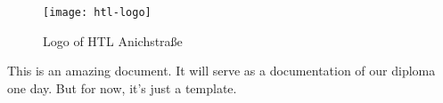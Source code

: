 \documentclass[../main.tex]{subfiles}
\begin{document}
\begin{figure}[bh]
\centering
\texttt{[image: htl-logo]}

\label{fig:img1}
\caption{Logo of HTL Anichstraße}
\end{figure}

This is  an amazing document. It will serve as a documentation of our diploma one day. But for now, it's just a template.
\end{document}
